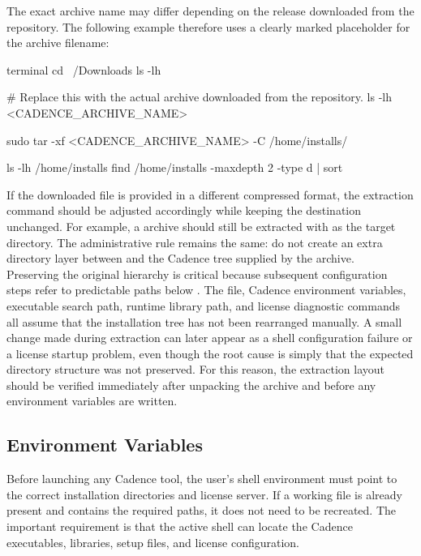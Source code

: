 \noindent The exact archive name may differ depending on the release downloaded from the repository.
The following example therefore uses a clearly marked placeholder for the archive filename:

\begin{codeblock}{terminal}
cd ~/Downloads
ls -lh

# Replace this with the actual archive downloaded from the repository.
ls -lh <CADENCE_ARCHIVE_NAME>

sudo tar -xf <CADENCE_ARCHIVE_NAME> -C /home/installs/

ls -lh /home/installs
find /home/installs -maxdepth 2 -type d | sort
\end{codeblock}

\noindent If the downloaded file is provided in a different compressed format, the extraction command
should be adjusted accordingly while keeping the destination unchanged. For example, a
 archive should still be extracted with  as the target
directory. The administrative rule remains the same: do not create an extra directory layer between
 and the Cadence tree supplied by the archive.\\

\noindent Preserving the original hierarchy is critical because subsequent configuration steps refer
to predictable paths below . The  file, Cadence
environment variables, executable search path, runtime library path, and license diagnostic commands
all assume that the installation tree has not been rearranged manually. A small change made during
extraction can later appear as a shell configuration failure or a license startup problem, even
though the root cause is simply that the expected directory structure was not preserved. For this
reason, the extraction layout should be verified immediately after unpacking the archive and before
any environment variables are written.

\subsection{Environment Variables}

Before launching any Cadence tool, the user's shell environment must point to the correct
installation directories and license server. If a working  file is already present
and contains the required paths, it does not need to be recreated. The important requirement is that
the active shell can locate the Cadence executables, libraries, setup files, and license
configuration.\\

